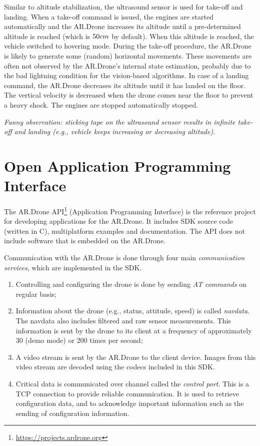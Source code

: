 Similar to altitude stabilization, the ultrasound sensor is used for take-off and landing.
When a take-off command is issued, the engines are started automatically and the AR.Drone increases its altitude until a pre-determined altitude is reached (which is $50\small{cm}$ by default). When this altitude is reached, the vehicle switched to hovering mode.
During the take-off procedure, the AR.Drone is likely to generate some (random) horizontal movements.
These movements are often not observed by the AR.Drone's internal state estimation, probably due to the bad lightning condition for the vision-based algorithms.
In case of a landing command, the AR.Drone decreases its altitude until it has landed on the floor. The vertical velocity is decreased when the drone comes near the floor to prevent a heavy shock.
The engines are stopped automatically stopped.

\textit{Funny observation: sticking tape on the ultrasound sensor results in infinite take-off and landing (e.g., vehicle keeps increasing or decreasing altitude).}


\section{Open Application Programming Interface}
\label{sec:API}
The AR.Drone API\footnote{\url{https://projects.ardrone.org}} (Application Programming Interface) is the reference project for developing applications for the AR.Drone.
It includes SDK source code (written in C), multiplatform examples and documentation.
The API does not include software that is embedded on the AR.Drone.

Communication with the AR.Drone is done through four main \textit{communication services}, which are implemented in the SDK.
\begin{enumerate}
\item Controlling and configuring the drone is done by sending \textit{AT commands} on regular basis;
\item Information about the drone (e.g., status, attitude, speed) is called \textit{navdata}.
The navdata also includes filtered and raw sensor measurements.
This information is sent by the drone to its client at a frequency of approximately 30 (demo mode) or 200 times per second;
\item A video stream is sent by the AR.Drone to the client device.
Images from this video stream are decoded using the codecs included in this SDK.
\item Critical data is communicated over channel called the \textit{control port}.
This is a TCP connection to provide reliable communication.
It is used to retrieve configuration data, and to acknowledge important information such as the sending of configuration information.
\end{enumerate}


